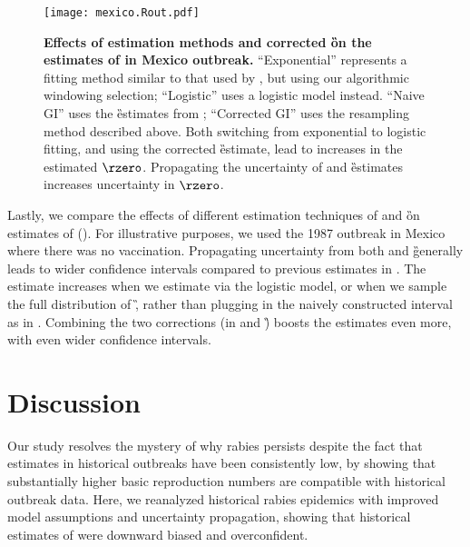 \FloatBarrier

\begin{center}
\begin{figure}[h]
\texttt{[image: mexico.Rout.pdf]}
\caption{\textbf{Effects of \littler estimation methods and corrected \G on the estimates of \rzero in Mexico outbreak.}
``Exponential'' represents a fitting method similar to that used by \cite{hampson2009transmission}, but using our algorithmic windowing selection; ``Logistic'' uses a logistic model instead. ``Naive GI'' uses the \G estimates from \cite{hampson2009transmission}; ``Corrected GI'' uses the resampling method described above. Both switching from exponential to logistic fitting, and using the corrected \G estimate, lead to increases in the estimated $\rzero$.  Propagating the uncertainty of \littler and \G estimates increases uncertainty in $\rzero$.
}
\end{figure}
\end{center}

\FloatBarrier

Lastly, we compare the effects of different estimation techniques of \littler and \G on estimates of \rzero (). 
For illustrative purposes, we used the 1987 outbreak in Mexico where there was no vaccination. 
Propagating uncertainty from both \littler and \G generally leads to wider confidence intervals compared to previous \rzero estimates in \citet{hampson2009transmission}.
The \rzero estimate increases when we estimate \littler via the logistic model, or when we sample the full distribution of \G, rather than plugging in the naively constructed interval as in \cite{hampson2009transmission} .
Combining the two corrections (in \littler and \G) boosts the \rzero estimates even more, with even wider confidence intervals.

\section*{Discussion}

Our study resolves the mystery of why rabies persists despite the fact that \rzero estimates in historical outbreaks have been consistently low, by showing that substantially higher basic reproduction numbers are compatible with historical outbreak data.
Here, we reanalyzed historical rabies epidemics with improved model assumptions and uncertainty propagation, showing that historical estimates of \rzero were downward biased and overconfident.

